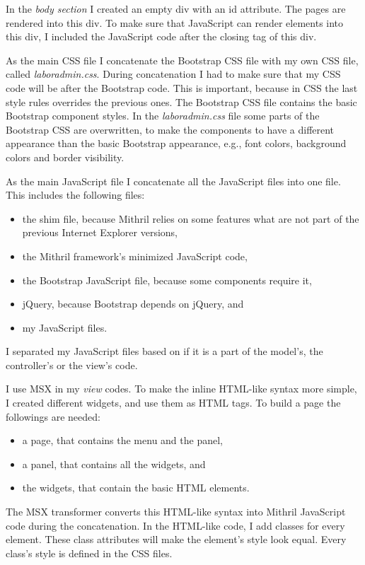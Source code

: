In the \emph{body section} I created an empty div with an id attribute. The pages are rendered into this div. To make sure that JavaScript can render elements into this div, I included the JavaScript code after the closing tag of this div.

As the main CSS file I concatenate the Bootstrap CSS file with my own CSS file, called \mbox{\emph{laboradmin.css}}. During concatenation I had to make sure that my CSS code will be after the Bootstrap code. This is important, because in CSS the last style rules overrides the previous ones. The Bootstrap CSS file contains the basic Bootstrap component styles. In the \mbox{\emph{laboradmin.css}} file some parts of the Bootstrap CSS are overwritten, to make the components to have a different appearance than the basic Bootstrap appearance, e.g., font colors, background colors and border visibility.

As the main JavaScript file I concatenate all the JavaScript files into one file. This includes the following files: 
\begin{itemize}
	\item the shim file, because Mithril relies on some features what are not part of the previous Internet Explorer versions,
	\item the Mithril framework's minimized JavaScript code,
	\item the Bootstrap JavaScript file, because some components require it,
	\item jQuery, because Bootstrap depends on jQuery, and
	\item my JavaScript files.
\end{itemize}

I separated my JavaScript files based on if it is a part of the model's, the controller's or the view's code. 

I use MSX in my \emph{view} codes. To make the inline HTML-like syntax more simple, I created different widgets, and use them as HTML tags. To build a page the followings are needed: 
\begin{itemize}
	\item a page, that contains the menu and the panel,
	\item a panel, that contains all the widgets, and
	\item the widgets, that contain the basic HTML elements.
\end{itemize}

The MSX transformer converts this HTML-like syntax into Mithril JavaScript code during the concatenation. In the HTML-like code, I add classes for every element. These class attributes will make the element's style look equal. Every class's style is defined in the CSS files.

